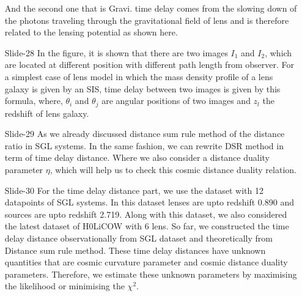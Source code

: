 \documentclass[12pt]{report}
\begin{document}
\begin{itemize}
And the second one that is Gravi. time delay comes from the slowing down of the photons traveling through the gravitational field of lens and is therefore related to the lensing potential as shown here.


\item[\ding{74} Slide-28]
In the figure, it is shown that there are two images $I_1$ and $I_2$, which are located at different position with different path length from observer. For a simplest case of lens model in which the mass density profile of a
lens galaxy is given by an SIS, time delay between two images is given by this formula, where, $\theta_i$ and  $\theta_j$ are angular positions of two images and $z_l$ the redshift of lens galaxy.

\item[\ding{74} Slide-29]
As we already discussed distance sum rule method of the distance ratio in SGL systems. In the same fashion, we can rewrite DSR method in term of time delay distance. Where we also consider a distance duality parameter $\eta$, which will help us to check this cosmic distance duality relation.

\item[\ding{74} Slide-30]
For the time delay distance part, we use the dataset with 12 datapoints of SGL systems. In this dataset lenses are upto redshift 0.890 and sources are upto redshift 2.719. Along with this dataset, we also considered the latest dataset of H0LiCOW with 6 lens. So far, we constructed the time delay distance observationally from SGL dataset and theoretically from Distance sum rule method. These time delay distances have unknown quantities that are cosmic curvature parameter and cosmic distance duality  parameters. Therefore, we estimate these unknown parameters by maximising the likelihood or minimising the $\chi^2$.


\end{itemize}
\end{document}
